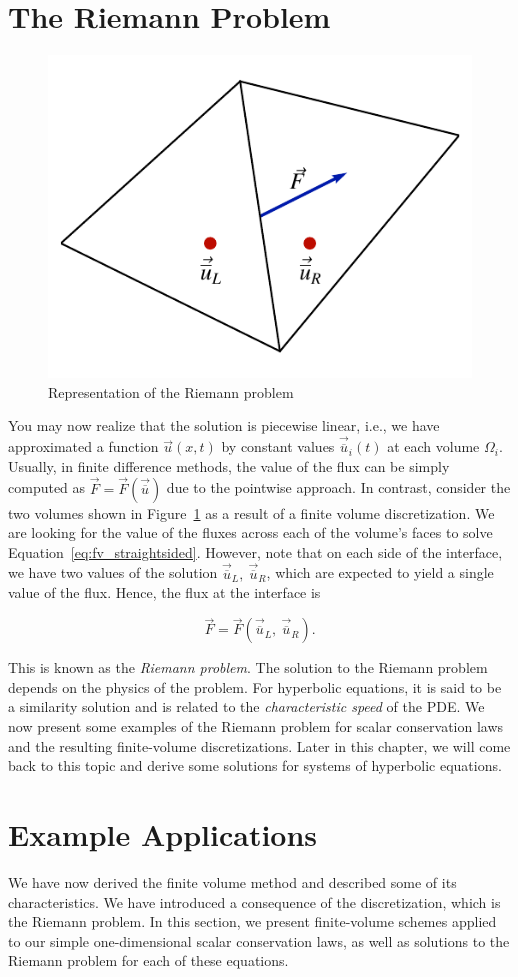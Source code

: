 \section{The Riemann Problem}
\begin{figure}[htbp]
 \centering
 \includegraphics[width=0.4\linewidth]{Pictures/fv_riemann_diagram}
 \caption{Representation of the Riemann problem}
 \label{fig:fv_riemannproblem}
\end{figure}
You may now realize that the solution is piecewise linear, i.e., we have approximated a function $\vec u(x,t)$ by constant values $\vec {\overline u}_i(t)$ at each volume $\Omega_i$. Usually, in finite difference methods, the value of the flux can be simply computed as $\vec{F}=\vec{F}(\vec{\overline{u}})$ due to the pointwise approach. In contrast, consider the two volumes shown in Figure~\ref{fig:fv_riemannproblem} as a result of a finite volume discretization. We are looking for the value of the fluxes across each of the volume's faces to solve Equation~\ref{eq:fv_straightsided}. However, note that on each side of the interface, we have two values of the solution $\vec{\overline{u}}_L,~\vec{\overline{u}}_R$, which are expected to yield a single value of the flux. Hence, the flux at the interface is
\begin{eqBox}
 \begin{equation}
 \vec{F} = \vec{F} (\vec{\overline{u}}_L,~\vec{\overline{u}}_R).
 \end{equation}
\end{eqBox}
This is known as the \textit{Riemann problem}. The solution to the Riemann problem depends on the physics of the problem. For hyperbolic equations, it is said to be a similarity solution and is related to the \textit{characteristic speed} of the PDE. We now present some examples of the Riemann problem for scalar conservation laws and the resulting finite-volume discretizations. Later in this chapter, we will come back to this topic and derive some solutions for systems of hyperbolic equations.

\section{Example Applications}
We have now derived the finite volume method and described some of its characteristics. We have introduced a consequence of the discretization, which is the Riemann problem. In this section, we present finite-volume schemes applied to our simple one-dimensional scalar conservation laws, as well as solutions to the Riemann problem for each of these equations.

